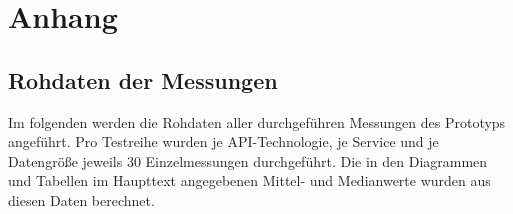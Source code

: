\chapter{Anhang}
\label{chap:anhang}

\section{Rohdaten der Messungen}
Im folgenden werden die Rohdaten aller durchgeführen Messungen des Prototyps angeführt. 
Pro Testreihe wurden je API-Technologie, je Service und je Datengröße jeweils 30 Einzelmessungen durchgeführt. Die in den Diagrammen und Tabellen im Haupttext angegebenen Mittel- und Medianwerte wurden aus diesen Daten berechnet.



